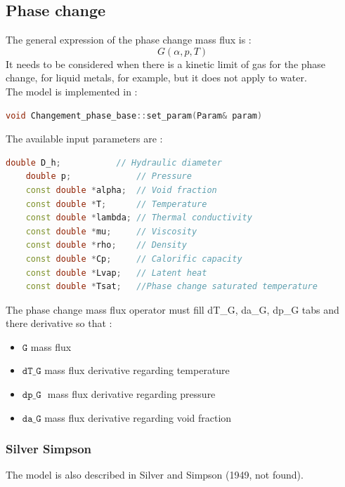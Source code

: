 \subsection{Phase change}
The general expression of the phase change mass flux is :
\begin{equation}
    G(\alpha,p,T)
\end{equation}
It needs to be considered when there is a kinetic limit of gas for the phase change, for liquid metals, for example, but it does not apply to water.\\
The model is implemented in :
\begin{lstlisting}[language=c++]
void Changement_phase_base::set_param(Param& param)
\end{lstlisting}
The available input parameters are :
\begin{lstlisting}[language=c++]
    double D_h;           // Hydraulic diameter
    double p;             // Pressure
    const double *alpha;  // Void fraction
    const double *T;      // Temperature
    const double *lambda; // Thermal conductivity
    const double *mu;     // Viscosity
    const double *rho;    // Density
    const double *Cp;     // Calorific capacity
    const double *Lvap;   // Latent heat
    const double *Tsat;   //Phase change saturated temperature
\end{lstlisting}
The phase change mass flux operator must fill dT_G, da_G, dp_G tabs and there derivative so that :
\begin{itemize}
    \item[\small \textcolor{blue}{\ding{109}}]$\texttt{G}$ mass flux
    \item[\small \textcolor{blue}{\ding{109}}] $\texttt{dT\_G}$ mass flux derivative regarding temperature
    \item[\small \textcolor{blue}{\ding{109}}]$\texttt{dp\_G }$ mass flux derivative regarding pressure
    \item[\small \textcolor{blue}{\ding{109}}]$\texttt{da\_G}$ mass flux derivative regarding void fraction
\end{itemize}

\subsubsection{Silver Simpson}
The model is also described in  Silver and Simpson (1949, not found).


